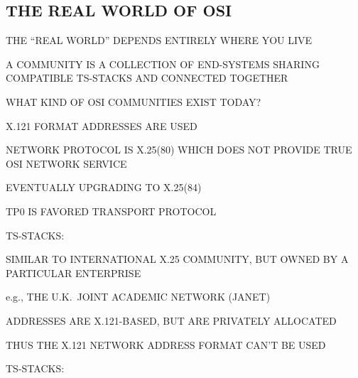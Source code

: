 \begin{bwslide}
\part*	{THE REAL WORLD OF OSI}\bf

\begin{nrtc}
\item	THE ``REAL WORLD'' DEPENDS ENTIRELY WHERE YOU LIVE

\item	A COMMUNITY IS A COLLECTION OF END-SYSTEMS SHARING COMPATIBLE
	TS-STACKS AND CONNECTED TOGETHER

\item	WHAT KIND OF OSI COMMUNITIES EXIST TODAY?
\end{nrtc}
\end{bwslide}


\begin{bwslide}

\begin{nrtc}
\item	X.121 FORMAT ADDRESSES ARE USED

\item	NETWORK PROTOCOL IS X.25(80) WHICH DOES NOT PROVIDE TRUE
	OSI NETWORK SERVICE
    \begin{nrtc}
    \item	EVENTUALLY UPGRADING TO X.25(84)
    \end{nrtc}

\item	TP0 IS FAVORED TRANSPORT PROTOCOL

\item	TS-STACKS:
\end{nrtc}

\end{bwslide}


\begin{bwslide}

\begin{nrtc}
\item	SIMILAR TO INTERNATIONAL X.25 COMMUNITY,
	BUT OWNED BY A PARTICULAR ENTERPRISE
    \begin{nrtc}
    \item	e.g., THE U.K.~JOINT ACADEMIC NETWORK (JANET)    
    \end{nrtc}

\item	ADDRESSES ARE X.121-BASED, BUT ARE PRIVATELY ALLOCATED
    \begin{nrtc}
    \item	THUS THE X.121 NETWORK ADDRESS FORMAT CAN'T BE USED
    \end{nrtc}

\item	TS-STACKS:
\end{nrtc}

\end{bwslide}


